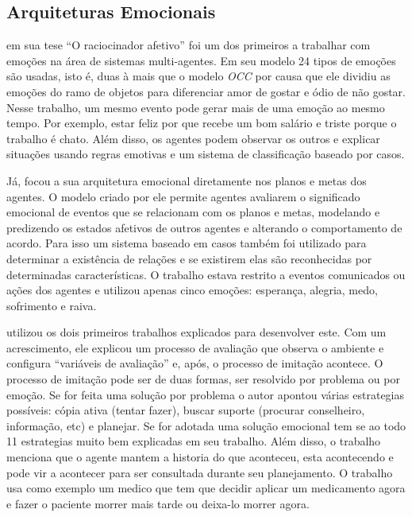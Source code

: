 \subsection{Arquiteturas Emocionais} %

\citet{elliott1992tar} em sua tese ``O raciocinador afetivo'' foi um dos
primeiros a trabalhar com emoções na área de sistemas multi-agentes. Em seu
modelo 24 tipos de emoções são usadas, isto é, duas à mais que o modelo
\emph{OCC} por causa que ele dividiu as emoções do ramo de objetos para
diferenciar amor de gostar e ódio de não gostar. Nesse trabalho, um mesmo
evento pode gerar mais de uma emoção ao mesmo tempo. Por exemplo, estar feliz
por que recebe um bom salário e triste porque o trabalho é chato. Além disso,
os agentes podem observar os outros e explicar situações usando regras
emotivas e um sistema de classificação baseado por casos.

Já, \citet{gratch2000empitae} focou a sua arquitetura emocional diretamente
nos planos e metas dos agentes. O modelo criado por ele permite agentes
avaliarem o significado emocional de eventos que se relacionam com os planos e
metas, modelando e predizendo os estados afetivos de outros agentes e
alterando o comportamento de acordo. Para isso um sistema baseado em casos
também foi utilizado para determinar a existência de relações e se existirem
elas são reconhecidas por determinadas características. O trabalho estava
restrito a eventos comunicados ou ações dos agentes e utilizou apenas cinco
emoções: esperança, alegria, medo, sofrimento e raiva.

\citet{gratch2004domain} utilizou os dois primeiros trabalhos explicados para
desenvolver este. Com um acrescimento, ele explicou um processo de avaliação
que observa o ambiente e configura ``variáveis de avaliação'' e, após, o
processo de imitação acontece. O processo de imitação pode ser de duas formas,
ser resolvido por problema ou por emoção. Se for feita uma solução por
problema o autor apontou várias estrategias possíveis: cópia ativa (tentar
fazer), buscar suporte (procurar conselheiro, informação, etc) e planejar. Se
for adotada uma solução emocional tem se ao todo 11 estrategias muito bem
explicadas em seu trabalho. Além disso, o trabalho menciona que o agente
mantem a historia do que aconteceu, esta acontecendo e pode vir a
acontecer para ser consultada durante seu planejamento. O trabalho usa como
exemplo um medico que tem que decidir aplicar um medicamento agora e fazer o
paciente morrer mais tarde ou deixa-lo morrer agora.

